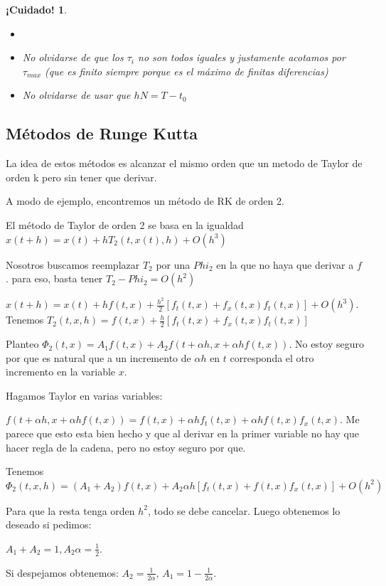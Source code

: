 \documentclass[10pt,a4paper,final]{report}
\newtheorem{caution}{¡Cuidado!}
\begin{document}
\begin{caution}
\begin{itemize}
	\item[]
	\item No olvidarse de que los $\tau_i$ no son todos iguales y justamente acotamos por $\tau_{max}$ (que es finito siempre porque es el máximo de finitas diferencias)
	\item No olvidarse de usar que $hN = T - t_0$
\end{itemize}
\end{caution}


\subsection*{Métodos de Runge Kutta}

La idea de estos métodos es alcanzar el mismo orden que un metodo de Taylor de orden k pero sin tener que derivar.

A modo de ejemplo, encontremos un método de RK de orden 2.

El método de Taylor de orden 2 se basa en la igualdad $x(t+h)= x(t) + h T_2(t,x(t),h) + O(h^3)$

Nosotros buscamos reemplazar $T_2$ por una $Phi_2$ en la que no haya que derivar a $f$. para eso, basta tener $T_2 - Phi_2 = O(h^2)$


$x(t+h) = x(t) + hf(t,x) + \frac{h^2}{2} [f_t(t,x) + f_x(t,x) f_t(t,x)] + O(h^3)$. Tenemos $T_2(t,x,h) = f(t,x) + \frac{h}{2} [f_t(t,x) + f_x(t,x) f_t(t,x)]$

Planteo $\Phi_2(t,x) = A_1 f(t,x) + A_2 f(t + \alpha h, x + \alpha h f(t,x))$. No estoy seguro por que es natural que a un incremento de $\alpha h$ en $t$ corresponda el otro incremento en la variable $x$.

Hagamos Taylor en varias variables:

$f(t + \alpha h, x + \alpha h f(t,x)) = f(t,x) + \alpha h f_t(t,x) + \alpha h f(t,x) f_x(t,x)$. Me parece que esto esta bien hecho y que al derivar en la primer variable no hay que hacer regla de la cadena, pero no estoy seguro por que.

Tenemos $\Phi_2(t,x,h) = (A_1 + A_2) f(t,x) + A_2 \alpha h [f_t(t,x) + f(t,x) f_x(t,x)] + O(h^2)$

Para que la resta tenga orden $h^2$, todo se debe cancelar. Luego obtenemos lo deseado si pedimos:

$A_1 + A_2 = 1, A_2 \alpha = \frac{1}{2}$.

Si despejamos obtenemos: $A_2 = \frac{1}{2 \alpha}$, $A_1 = 1 - \frac{1}{2 \alpha}$.
\end{document}
